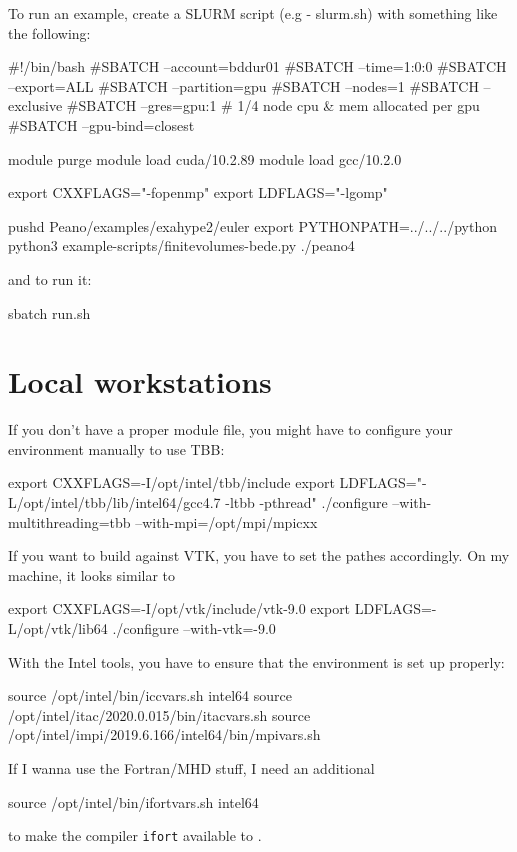 To run an example, create a SLURM script (e.g - slurm.sh) with something like the following:
\begin{code}
#!/bin/bash
#SBATCH --account=bddur01
#SBATCH --time=1:0:0
#SBATCH --export=ALL
#SBATCH --partition=gpu
#SBATCH --nodes=1
#SBATCH --exclusive
#SBATCH --gres=gpu:1  # 1/4 node cpu & mem allocated per gpu
#SBATCH --gpu-bind=closest

 module purge
 module load cuda/10.2.89
 module load gcc/10.2.0

 export CXXFLAGS="-fopenmp"
 export LDFLAGS="-lgomp"

 pushd Peano/examples/exahype2/euler
 export PYTHONPATH=../../../python
 python3 example-scripts/finitevolumes-bede.py
 ./peano4
\end{code}

and to run it:
\begin{code}
  sbatch run.sh
\end{code}

\section{Local workstations}



If you don't have a proper module file, you might have to configure your environment manually to use TBB:
\begin{code}
 export CXXFLAGS=-I/opt/intel/tbb/include
 export LDFLAGS="-L/opt/intel/tbb/lib/intel64/gcc4.7 -ltbb -pthread"
 ./configure --with-multithreading=tbb --with-mpi=/opt/mpi/mpicxx
\end{code}


If you want to build against VTK, you have to set the pathes accordingly. 
On my machine, it looks similar to
\begin{code}
 export CXXFLAGS=-I/opt/vtk/include/vtk-9.0
 export LDFLAGS=-L/opt/vtk/lib64
 ./configure --with-vtk=-9.0
\end{code}


With the Intel tools, you have to ensure that the environment is set up 
properly:
\begin{code}
source /opt/intel/bin/iccvars.sh intel64
source /opt/intel/itac/2020.0.015/bin/itacvars.sh
source /opt/intel/impi/2019.6.166/intel64/bin/mpivars.sh
\end{code}
\label{label:supercomputer:Intel-scripts}


If I wanna use the Fortran/MHD stuff, I need an additional
\begin{code}
source /opt/intel/bin/ifortvars.sh intel64
\end{code}
to make the compiler \texttt{ifort} available to \Peano.


